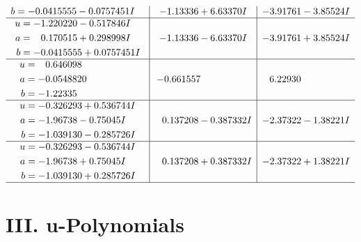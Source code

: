 \documentclass[1p]{elsarticle_modified}
\theoremstyle{definition}
\begin{document}
$$\begin{array}{c|c|c}
\begin{aligned}
b &= -0.0415555 - 0.0757451 I\end{aligned}
 & -1.13336 + 6.63370 I & -3.91761 - 3.85524 I \\ \hline\begin{aligned}
u &= -1.220220 - 0.517846 I \\
a &= \phantom{-}0.170515 + 0.298998 I \\
b &= -0.0415555 + 0.0757451 I\end{aligned}
 & -1.13336 - 6.63370 I & -3.91761 + 3.85524 I \\ \hline\begin{aligned}
u &= \phantom{-}0.646098\phantom{ +0.000000I} \\
a &= -0.0548820\phantom{ +0.000000I} \\
b &= -1.22335\phantom{ +0.000000I}\end{aligned}
 & -0.661557\phantom{ +0.000000I} & \phantom{-}6.22930\phantom{ +0.000000I} \\ \hline\begin{aligned}
u &= -0.326293 + 0.536744 I \\
a &= -1.96738 - 0.75045 I \\
b &= -1.039130 - 0.285726 I\end{aligned}
 & \phantom{-}0.137208 - 0.387332 I & -2.37322 - 1.38221 I \\ \hline\begin{aligned}
u &= -0.326293 - 0.536744 I \\
a &= -1.96738 + 0.75045 I \\
b &= -1.039130 + 0.285726 I\end{aligned}
 & \phantom{-}0.137208 + 0.387332 I & -2.37322 + 1.38221 I\\
 \hline 
 \end{array}$$\newpage
\newpage\renewcommand{\arraystretch}{1}
\centering \section*{ III. u-Polynomials}
\end{document}
